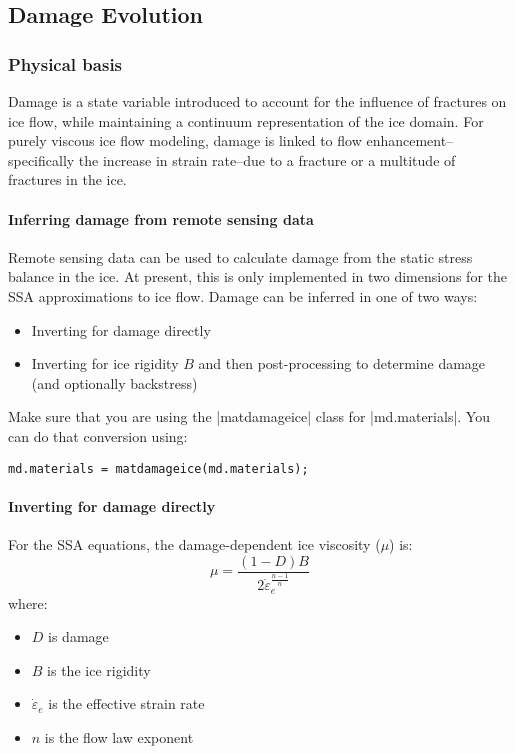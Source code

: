 
\subsection{Damage Evolution} \label{sec:using-issm-capabilities-damage}

\subsubsection{Physical basis}
Damage is a state variable introduced to account for the influence of fractures on ice flow, while maintaining a continuum representation of the ice domain. For purely viscous ice flow modeling, damage is linked to flow enhancement--specifically the increase in strain rate--due to a fracture or a multitude of fractures in the ice.

\paragraph{Inferring damage from remote sensing data}
Remote sensing data can be used to calculate damage from the static stress balance in the ice. At present, this is only implemented in two dimensions for the SSA approximations to ice flow. Damage can be inferred in one of two ways:
\begin{itemize}
	\item Inverting for damage directly
	\item Inverting for ice rigidity $B$ and then post-processing to determine damage (and optionally backstress)
\end{itemize}

Make sure that you are using the \lstinlinebg|matdamageice| class for \lstinlinebg|md.materials|. You can do that conversion using:
\begin{lstlisting}
md.materials = matdamageice(md.materials);
\end{lstlisting}

\paragraph{Inverting for damage directly}
For the SSA equations, the damage-dependent ice viscosity ($\mu$) is:
\begin{equation}
	\mu=\frac{\left(1-D\right)B}{2\dot{\varepsilon}_e^{\frac{n-1}{n}}}
\end{equation}
where:
\begin{itemize}
	\item $D$ is damage
	\item $B$ is the ice rigidity
	\item $\dot{\varepsilon}_e$ is the effective strain rate
	\item $n$ is the flow law exponent
\end{itemize}

